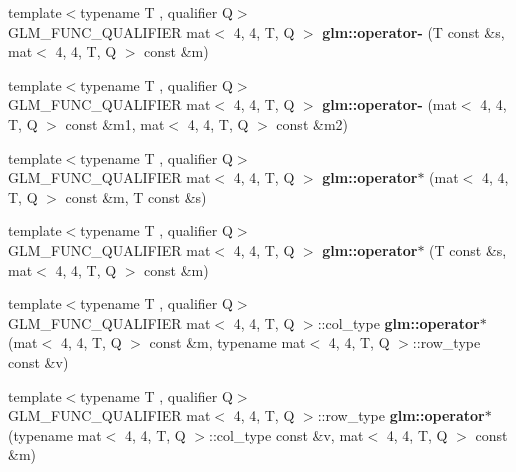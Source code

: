 \begin{DoxyCompactItemize}
\item 
\mbox{\label{type__mat4x4_8inl_af1c9d3364d199255b36f08ead113e1ce}} 
{\footnotesize template$<$typename T , qualifier Q$>$ }\\G\+L\+M\+\_\+\+F\+U\+N\+C\+\_\+\+Q\+U\+A\+L\+I\+F\+I\+ER mat$<$ 4, 4, T, Q $>$ {\bfseries glm\+::operator-\/} (T const \&s, mat$<$ 4, 4, T, Q $>$ const \&m)
\item 
\mbox{\label{type__mat4x4_8inl_a003c4a084c06d618838ca9cbd23703d3}} 
{\footnotesize template$<$typename T , qualifier Q$>$ }\\G\+L\+M\+\_\+\+F\+U\+N\+C\+\_\+\+Q\+U\+A\+L\+I\+F\+I\+ER mat$<$ 4, 4, T, Q $>$ {\bfseries glm\+::operator-\/} (mat$<$ 4, 4, T, Q $>$ const \&m1, mat$<$ 4, 4, T, Q $>$ const \&m2)
\item 
\mbox{\label{type__mat4x4_8inl_a5c0a2f1c927fa82395e818d38dda40af}} 
{\footnotesize template$<$typename T , qualifier Q$>$ }\\G\+L\+M\+\_\+\+F\+U\+N\+C\+\_\+\+Q\+U\+A\+L\+I\+F\+I\+ER mat$<$ 4, 4, T, Q $>$ {\bfseries glm\+::operator$\ast$} (mat$<$ 4, 4, T, Q $>$ const \&m, T const \&s)
\item 
\mbox{\label{type__mat4x4_8inl_a5e8439deb5e4bd729665a6f3babb10fe}} 
{\footnotesize template$<$typename T , qualifier Q$>$ }\\G\+L\+M\+\_\+\+F\+U\+N\+C\+\_\+\+Q\+U\+A\+L\+I\+F\+I\+ER mat$<$ 4, 4, T, Q $>$ {\bfseries glm\+::operator$\ast$} (T const \&s, mat$<$ 4, 4, T, Q $>$ const \&m)
\item 
\mbox{\label{type__mat4x4_8inl_a06757e039fd5931572ab128492a78b49}} 
{\footnotesize template$<$typename T , qualifier Q$>$ }\\G\+L\+M\+\_\+\+F\+U\+N\+C\+\_\+\+Q\+U\+A\+L\+I\+F\+I\+ER mat$<$ 4, 4, T, Q $>$\+::col\+\_\+type {\bfseries glm\+::operator$\ast$} (mat$<$ 4, 4, T, Q $>$ const \&m, typename mat$<$ 4, 4, T, Q $>$\+::row\+\_\+type const \&v)
\item 
\mbox{\label{type__mat4x4_8inl_ad1596a8d5b5d11322c0f70288f5b4dce}} 
{\footnotesize template$<$typename T , qualifier Q$>$ }\\G\+L\+M\+\_\+\+F\+U\+N\+C\+\_\+\+Q\+U\+A\+L\+I\+F\+I\+ER mat$<$ 4, 4, T, Q $>$\+::row\+\_\+type {\bfseries glm\+::operator$\ast$} (typename mat$<$ 4, 4, T, Q $>$\+::col\+\_\+type const \&v, mat$<$ 4, 4, T, Q $>$ const \&m)

\end{DoxyCompactItemize}
